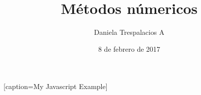 \documentclass[12pt, leterpaper, twoside]{article}
\title{Métodos númericos}
\author{Daniela Trespalacios A}
\date{8 de febrero de 2017}
\begin{document}
\begin{titlepage}
    \maketitle
\end{titlepage}


[caption=My Javascript Example]

%


%


%
\end{document}
